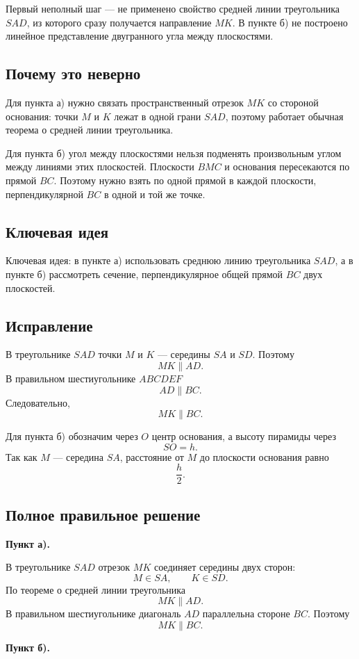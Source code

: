 \documentclass[12pt,a4paper]{article}
\begin{document}
Первый неполный шаг --- не применено свойство средней линии треугольника $SAD$, из которого сразу получается направление $MK$. В пункте б) не построено линейное представление двугранного угла между плоскостями.

\subsection*{Почему это неверно}
Для пункта а) нужно связать пространственный отрезок $MK$ со стороной основания: точки $M$ и $K$ лежат в одной грани $SAD$, поэтому работает обычная теорема о средней линии треугольника.

Для пункта б) угол между плоскостями нельзя подменять произвольным углом между линиями этих плоскостей. Плоскости $BMC$ и основания пересекаются по прямой $BC$. Поэтому нужно взять по одной прямой в каждой плоскости, перпендикулярной $BC$ в одной и той же точке.

\subsection*{Ключевая идея}
\textcolor{blue!60!black}{Ключевая идея:} в пункте а) использовать среднюю линию треугольника $SAD$, а в пункте б) рассмотреть сечение, перпендикулярное общей прямой $BC$ двух плоскостей.

\subsection*{Исправление}
В треугольнике $SAD$ точки $M$ и $K$ --- середины $SA$ и $SD$. Поэтому
\[
MK\parallel AD.
\]
В правильном шестиугольнике $ABCDEF$
\[
AD\parallel BC.
\]
Следовательно,
\[
MK\parallel BC.
\]

Для пункта б) обозначим через $O$ центр основания, а высоту пирамиды через
\[
SO=h.
\]
Так как $M$ --- середина $SA$, расстояние от $M$ до плоскости основания равно
\[
\frac h2.
\]

\subsection*{Полное правильное решение}
\textbf{Пункт а).}

В треугольнике $SAD$ отрезок $MK$ соединяет середины двух сторон:
\[
M\in SA,\qquad K\in SD.
\]
По теореме о средней линии треугольника
\[
MK\parallel AD.
\]
В правильном шестиугольнике диагональ $AD$ параллельна стороне $BC$. Поэтому
\[
\boxed{MK\parallel BC}.
\]

\textbf{Пункт б).}
\end{document}
